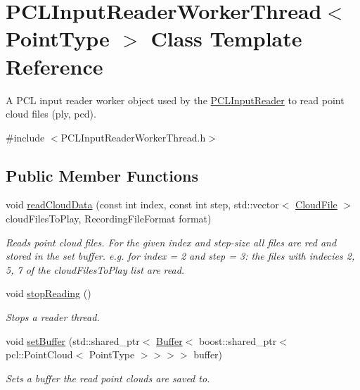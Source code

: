 \hypertarget{class_p_c_l_input_reader_worker_thread}{}\section{P\+C\+L\+Input\+Reader\+Worker\+Thread$<$ Point\+Type $>$ Class Template Reference}
\label{class_p_c_l_input_reader_worker_thread}


A P\+C\+L input reader worker object used by the \hyperlink{class_p_c_l_input_reader}{P\+C\+L\+Input\+Reader} to read point cloud files (ply, pcd).  




{\ttfamily \#include $<$P\+C\+L\+Input\+Reader\+Worker\+Thread.\+h$>$}

\subsection*{Public Member Functions}
\begin{DoxyCompactItemize}
\item 
void \hyperlink{class_p_c_l_input_reader_worker_thread_ab0a65a6918b081159c2c41f5df01176e}{read\+Cloud\+Data} (const int index, const int step, std\+::vector$<$ \hyperlink{struct_cloud_file}{Cloud\+File} $>$ cloud\+Files\+To\+Play, Recording\+File\+Format format)
\begin{DoxyCompactList}\small\item\em Reads point cloud files. For the given index and step-\/size all files are red and stored in the set buffer. e.\+g. for index = 2 and step = 3\+: the files with indecies 2, 5, 7 of the cloud\+Files\+To\+Play list are read. \end{DoxyCompactList}\item 
\hypertarget{class_p_c_l_input_reader_worker_thread_aa40da7f26a0d69e22f4b69ea49cf02e2}{}void \hyperlink{class_p_c_l_input_reader_worker_thread_aa40da7f26a0d69e22f4b69ea49cf02e2}{stop\+Reading} ()\label{class_p_c_l_input_reader_worker_thread_aa40da7f26a0d69e22f4b69ea49cf02e2}

\begin{DoxyCompactList}\small\item\em Stops a reader thread. \end{DoxyCompactList}\item 
void \hyperlink{class_p_c_l_input_reader_worker_thread_a55e5bd15db3a1d39a2661db2f812c258}{set\+Buffer} (std\+::shared\+\_\+ptr$<$ \hyperlink{class_buffer}{Buffer}$<$ boost\+::shared\+\_\+ptr$<$ pcl\+::\+Point\+Cloud$<$ Point\+Type $>$$>$$>$$>$ buffer)
\begin{DoxyCompactList}\small\item\em Sets a buffer the read point clouds are saved to. \end{DoxyCompactList}\end{DoxyCompactItemize}
